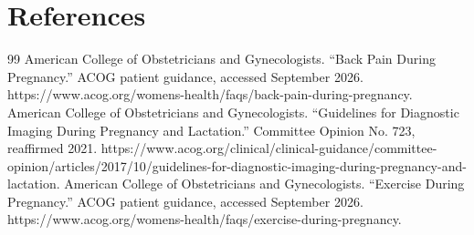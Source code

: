 \section*{References}
\begin{thebibliography}{99}
 American College of Obstetricians and Gynecologists. ``Back Pain During Pregnancy.'' ACOG patient guidance, accessed September 2026. https://www.acog.org/womens-health/faqs/back-pain-during-pregnancy.
 American College of Obstetricians and Gynecologists. ``Guidelines for Diagnostic Imaging During Pregnancy and Lactation.'' Committee Opinion No. 723, reaffirmed 2021. https://www.acog.org/clinical/clinical-guidance/committee-opinion/articles/2017/10/guidelines-for-diagnostic-imaging-during-pregnancy-and-lactation.
 American College of Obstetricians and Gynecologists. ``Exercise During Pregnancy.'' ACOG patient guidance, accessed September 2026. https://www.acog.org/womens-health/faqs/exercise-during-pregnancy.
\end{thebibliography}
